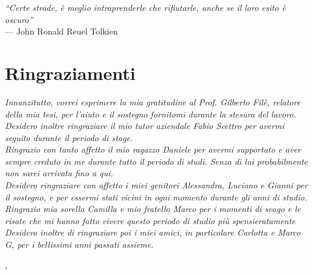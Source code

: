 
\cleardoublepage
{}
{}

\begin{flushright}{
	\slshape    
	``Certe strade, è meglio intraprenderle che rifiutarle, anche se il loro esito è oscuro''} \\ 
	\medskip
    --- John Ronald Reuel Tolkien
\end{flushright}


\bigskip

\begingroup
\let\clearpage\relax
\let\cleardoublepage\relax
\let\cleardoublepage\relax

\chapter*{Ringraziamenti}

\noindent \textit{Innanzitutto, vorrei esprimere la mia gratitudine al Prof. Gilberto Filè, relatore della mia tesi, per l'aiuto e il sostegno fornitomi durante la stesura del lavoro.}\\

\noindent \textit{Desidero inoltre ringraziare il mio tutor aziendale Fabio Scettro per avermi seguito durante il periodo di stage.}\\

\noindent \textit{Ringrazio con tanto affetto il mio ragazzo Daniele per avermi supportato e aver sempre creduto in me durante tutto il periodo di studi. Senza di lui probabilmente non sarei arrivata fino a qui.}\\

\noindent \textit{Desidero ringraziare con affetto i miei genitori Alessandra, Luciano e Gianni per il sostegno, e per essermi stati vicini in ogni momento durante gli anni di studio.}\\

\noindent \textit{Ringrazio mia sorella Camilla e mio fratello Marco per i momenti di svago e le risate che mi hanno fatto vivere questo periodo di studio più spensieratamente}\\

\noindent \textit{Desidero inoltre di ringraziare poi i miei amici, in particolare Carlotta e Marco G, per i bellissimi anni passati assieme.}\\
\bigskip

\noindent\textit{\myLocation, \myTime}
\hfill \myName

\endgroup


